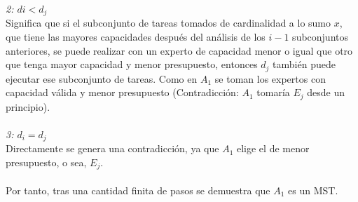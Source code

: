 \documentclass[10pt,letterpaper]{article}
\begin{document}
{ 	\textit{2: $d{i} < d_{j}$} \\
 	Significa que si el subconjunto de tareas tomados de cardinalidad a lo sumo $x$, que tiene las mayores capacidades despu\'es del an\'alisis de los $i - 1$ subconjuntos anteriores, se puede realizar con un experto de capacidad menor o igual que otro que tenga mayor capacidad y menor presupuesto, entonces $d_{j}$ tambi\'en puede ejecutar ese subconjunto de tareas. Como en $A_{1}$ se toman los expertos con capacidad v\'alida y menor presupuesto (Contradicci\'on: $A_{1}$ tomar\'ia $E_{j}$ desde un principio). \\ \\
 	\textit{3: $d_{i} = d_{j}$} \\
 	 Directamente se genera una contradicci\'on, ya que $A_{1}$ elige el de menor presupuesto, o sea, $E_{j}$. \\ \\
 	 Por tanto, tras una cantidad finita de pasos se demuestra que $A_{1}$ es un MST. \\ \\
 	 
}
\end{document}
